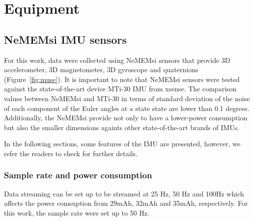 		\chapter{Equipment} \label{appendix:b}



\graphicspath{{figs/appendixB/PDF/}}

%
%


\section{NeMEMsi IMU sensors}  \label{appendix:imus}
For this work, data were collected using NeMEMsi sensors \cite{Comotti2014}
that provide 3D accelerometer, 3D magnetometer, 3D gyroscope and quaternions
(Figure~\ref{fig:muse}).
It is important to note that NeMEMsi sensors 
were tested against the state-of-the-art device MTi-30 IMU from xsense.
The comparison values between NeMEMsi and MTi-30 in terms of standard deviation 
of the noise of each component of the Euler angles at a state state are lower than
0.1 degrees. 
Additionally, the NeMEMsi provide not only to have a lower-power consumption 
but also the smaller dimensions againts other state-of-the-art brands of IMUs.

In the following sections, some features of the IMU are presented,
however, we refer the readers to check \cite{Comotti2014} for further details.

\subsection*{Sample rate and power consumption}
Data streaming can be set up to be streamed at 25 Hz, 50 Hz and 100Hz which
affects the power comsuption from 29mAh, 32mAh and 35mAh, respectively.
For this work, the sample rate were set up to 50 Hz.

